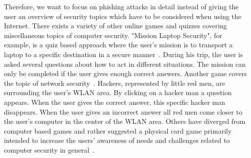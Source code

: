Therefore, we want to focus on phishing attacks in detail instead of giving the user an overview of security topics which have to be considered when using the Internet.
There exists a variety of other online games and quizzes covering miscellaneous topics of computer security.
"Mission Laptop Security", for example, is a quiz based approach where the user's mission is to transport a laptop to a specific destination in a secure manner~\cite{laptopsecurity}. 
During his trip, the user is asked several questions about how to act in different situations. 
The mission can only be completed if the user gives enough correct answers.
Another game covers the topic of network security~\cite{wirelesshackers}. 
Hackers, represented by little red men, are surrounding the user's WLAN area. 
By clicking on a hacker man a question appears. 
When the user gives the correct answer, this specific hacker man disappears. 
When the user gives an incorrect answer all red men come closer to the user's computer in the center of the WLAN area.
Others have diverged from computer based games and rather suggested a physical card game primarily intended to increase the users' awareness of needs and challenges related to computer security in general~\cite{denning2013controlalthack}.







 

